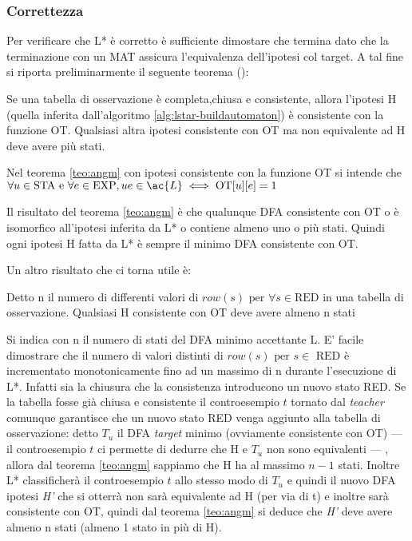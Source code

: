 \subsubsection{Correttezza}
\label{sub:cor}
Per verificare che L* è corretto è sufficiente dimostare che termina dato che la terminazione con un  \ac{MAT} assicura l'equivalenza dell'ipotesi col target.
A tal fine si riporta preliminarmente il seguente teorema (\cite{Angluin87}):
\begin{teorema}
\label{teo:angm}
Se una tabella di osservazione è completa,chiusa e consistente, allora l'ipotesi \ac{H} (quella inferita dall'algoritmo \ref{alg:lstar-buildautomaton}) è consistente con la funzione OT. Qualsiasi altra ipotesi consistente con OT ma non equivalente ad \ac{H} deve avere più stati.
\end{teorema}
Nel teorema \ref{teo:angm} con ipotesi consistente con la funzione OT si intende che $\forall u \in \text{STA e } \forall e \in \text{EXP},  ue \in \ac{L} \iff \text{OT}[u][e] = 1$

Il risultato del teorema \ref{teo:angm} è che qualunque DFA consistente con OT o è isomorfico all'ipotesi inferita da L* o contiene almeno uno o più stati. Quindi ogni ipotesi \ac{H} fatta da L* è sempre il minimo DFA consistente con OT.

Un altro risultato che ci torna utile è:
\begin{lemma}
\label{lem:fgv}
Detto n il numero di differenti valori di $row(s) \text{ per } \forall s \in \text{RED}$ in una tabella di osservazione. Qualsiasi \ac{H} consistente con OT deve avere almeno n stati
\end{lemma}
Si indica con n il numero di stati del DFA minimo accettante \ac{L}. E' facile dimostrare che il numero di valori distinti di $row(s) \text{ per } s \in \text{ RED} $ è incrementato monotonicamente fino ad un massimo di n durante l'esecuzione di L*. Infatti sia la chiusura che la consistenza introducono un nuovo stato RED. Se la tabella fosse già chiusa e consistente il controesempio $t$ tornato dal \textit{teacher} comunque garantisce che un nuovo stato RED venga aggiunto alla tabella di osservazione: detto $T_u$ il DFA \textit{target} minimo (ovviamente consistente con OT) --- il controesempio $t$ ci permette di dedurre che \ac{H} e  $T_u$  non sono equivalenti ---  , allora dal teorema \ref{teo:angm} sappiamo che \ac{H} ha al massimo $n-1$ stati. Inoltre L* classificherà il controesempio $t$ allo stesso modo di $T_u$ e quindi il nuovo DFA ipotesi \textit{H'} che  si otterrà  non sarà equivalente ad \ac{H} (per via di t) e inoltre sarà consistente con OT, quindi dal teorema \ref{teo:angm}  si deduce che \textit{H'} deve avere almeno n stati (almeno 1 stato in più di \ac{H}).

